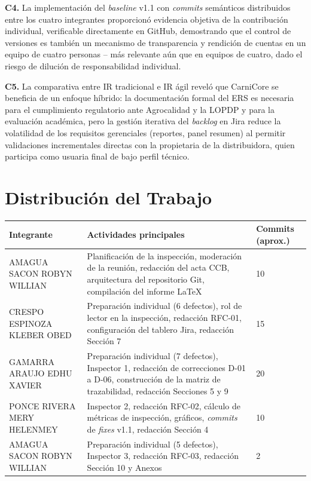 \documentclass[11pt,a4paper]{article}
\begin{document}
\textbf{C4.} La implementación del \textit{baseline} v1.1 con \textit{commits} semánticos distribuidos entre los
cuatro integrantes proporcionó evidencia objetiva de la contribución individual, verificable
directamente en GitHub, demostrando que el control de versiones es también un mecanismo de
transparencia y rendición de cuentas en un equipo de cuatro personas -- más relevante aún que en
equipos de cuatro, dado el riesgo de dilución de responsabilidad individual.

\textbf{C5.} La comparativa entre IR tradicional e IR ágil reveló que CarniCore se beneficia de
un enfoque híbrido: la documentación formal del ERS es necesaria para el cumplimiento
regulatorio ante Agrocalidad y la LOPDP y para la evaluación académica, pero la gestión
iterativa del \textit{backlog} en Jira reduce la volatilidad de los requisitos gerenciales (reportes,
panel resumen) al permitir validaciones incrementales directas con la propietaria de la
distribuidora, quien participa como usuaria final de bajo perfil técnico.

\section{Distribución del Trabajo}
\begin{longtable}{|p{3.3cm}|p{8.5cm}|p{1.6cm}|}
\hline
\textbf{Integrante} & \textbf{Actividades principales} & \textbf{Commits (aprox.)} \\
\hline
AMAGUA SACON ROBYN WILLIAN & Planificación de la inspección, moderación de la reunión, redacción del acta CCB, arquitectura del repositorio Git, compilación del informe LaTeX & 10 \\
\hline
CRESPO ESPINOZA KLEBER OBED & Preparación individual (6 defectos), rol de lector en la inspección, redacción RFC-01, configuración del tablero Jira, redacción Sección 7 & 15 \\
\hline
GAMARRA ARAUJO EDHU XAVIER & Preparación individual (7 defectos), Inspector 1, redacción de correcciones D-01 a D-06, construcción de la matriz de trazabilidad, redacción Secciones 5 y 9 & 20 \\
\hline
PONCE RIVERA MERY HELENMEY & Inspector 2, redacción RFC-02, cálculo de métricas de inspección, gráficos, \textit{commits} de \textit{fixes} v1.1, redacción Sección 4 & 10 \\
\hline
AMAGUA SACON ROBYN WILLIAN & Preparación individual (5 defectos), Inspector 3, redacción RFC-03, redacción Sección 10 y Anexos & 2 \\
\hline
\end{longtable}
\end{document}

